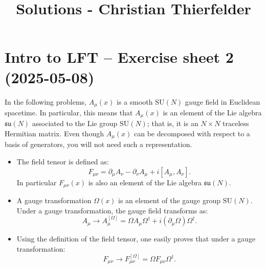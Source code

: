 \documentclass[10pt,a4paper]{article}
\title{Solutions - Christian Thierfelder}
\theoremstyle{definition}
\begin{document}
\maketitle
\section{Intro to LFT – Exercise sheet 2 (2025-05-08)}
{
\color{blue}
In the following problems, \( A_\mu(x) \) is a smooth \( \mathrm{SU}(N) \) gauge field in Euclidean spacetime. In particular, this means that \( A_\mu(x) \) is an element of the Lie algebra \( \mathfrak{su}(N) \) associated to the Lie group \( \mathrm{SU}(N) \); that is, it is an \( N \times N \) traceless Hermitian matrix. Even though \( A_\mu(x) \) can be decomposed with respect to a basis of generators, you will not need such a representation.
\begin{itemize}
\item The field tensor is defined as:
\begin{equation}
F_{\mu\nu} = \partial_\mu A_\nu - \partial_\nu A_\mu + i [A_\mu, A_\nu].
\end{equation}
In particular \( F_{\mu\nu}(x) \) is also an element of the Lie algebra \( \mathfrak{su}(N) \).

\item A gauge transformation \( \Omega(x) \) is an element of the gauge group \( \mathrm{SU}(N) \). Under a gauge transformation, the gauge field transforms as:
\begin{equation}
A_\mu \rightarrow A_\mu^{[\Omega]} = \Omega A_\mu \Omega^\dagger + i (\partial_\mu \Omega) \Omega^\dagger.
\end{equation}
\item Using the definition of the field tensor, one easily proves that under a gauge transformation:
\begin{equation}
F_{\mu\nu} \rightarrow F_{\mu\nu}^{[\Omega]} = \Omega F_{\mu\nu} \Omega^\dagger.
\end{equation}
\end{itemize}
}
\end{document}
